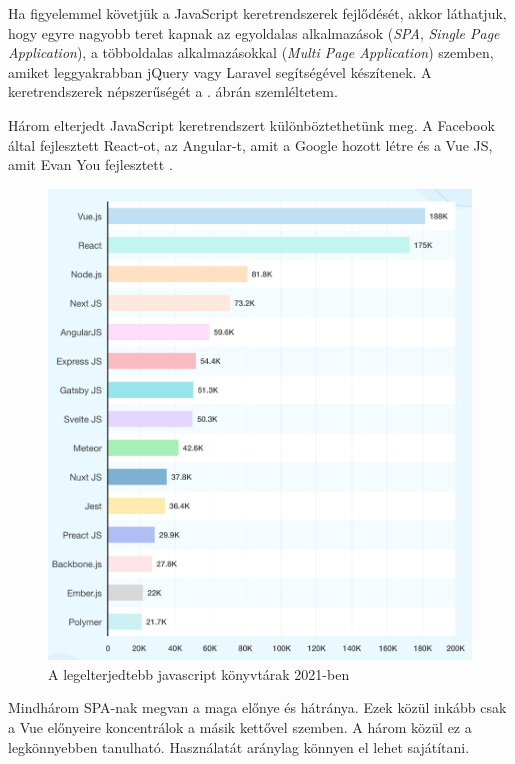 
Ha figyelemmel követjük a JavaScript keretrendszerek fejlődését, akkor láthatjuk, hogy egyre nagyobb teret kapnak az egyoldalas alkalmazások (\textit{SPA}, \textit{Single Page Application}), a többoldalas alkalmazásokkal (\textit{Multi Page Application}) szemben, amiket leggyakrabban jQuery vagy Laravel segítségével készítenek. A keretrendszerek népszerűségét a . ábrán szemléltetem.

Három elterjedt JavaScript keretrendszert különböztethetünk meg. A Facebook által fejlesztett React-ot, az Angular-t, amit a Google hozott létre és a Vue JS, amit Evan You fejlesztett
\cite{vue}.

\begin{figure}[h!]
	\centering
	\includegraphics[width=\textwidth]{images/js-framework-popularity.png}
	\caption{A legelterjedtebb javascript könyvtárak 2021-ben \cite{js-framework-popularity}}
	\label{fig:js-framework-popularity}
\end{figure}


Mindhárom SPA-nak megvan a maga előnye és hátránya. Ezek közül inkább csak a Vue előnyeire koncentrálok a másik kettővel szemben. A három közül ez a legkönnyebben tanulható. Használatát aránylag könnyen el lehet sajátítani.

